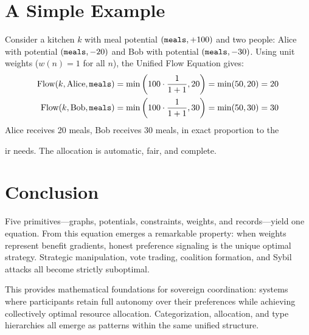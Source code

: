 \documentclass[11pt]{article}
\begin{document}
\section{A Simple Example}

Consider a kitchen $k$ with meal potential $({\tt meals}, +100)$ and two people: Alice with potential $({\tt meals}, -20)$ and Bob with potential $({\tt meals}, -30)$. Using unit weights ($w(n) = 1$ for all $n$), the Unified Flow Equation gives:
\begin{align}
\text{Flow}(k, \text{Alice}, {\tt meals}) &= \min\left(100 \cdot \frac{1}{1+1}, 20\right) = \min(50, 20) = 20 \\
\text{Flow}(k, \text{Bob}, {\tt meals}) &= \min\left(100 \cdot \frac{1}{1+1}, 30\right) = \min(50, 30) = 30
\end{align}
Alice receives 20 meals, Bob receives 30 meals, in exact proportion to the




ir needs. The allocation is automatic, fair, and complete.

\section{Conclusion}

Five primitives—graphs, potentials, constraints, weights, and records—yield one equation. From this equation emerges a remarkable property: when weights represent benefit gradients, honest preference signaling is the unique optimal strategy. Strategic manipulation, vote trading, coalition formation, and Sybil attacks all become strictly suboptimal.

This provides mathematical foundations for sovereign coordination: systems where participants retain full autonomy over their preferences while achieving collectively optimal resource allocation. Categorization, allocation, and type hierarchies all emerge as patterns within the same unified structure.
\end{document}
